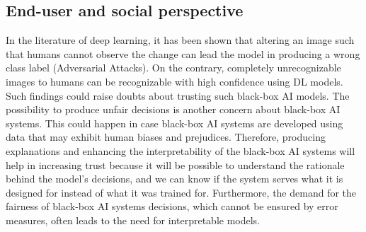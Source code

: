 \subsection*{End-user and social perspective}
In the literature of deep learning, it has been shown that altering an image such that humans cannot observe the change can lead the model in producing a wrong class label (Adversarial Attacks). 
On the contrary, completely unrecognizable images to humans can be recognizable with high confidence using DL models.
Such findings could raise doubts about trusting such black-box AI models. 
The possibility to produce unfair decisions is another concern about black-box AI systems. 
This could happen in case black-box AI systems are developed using data that may exhibit human biases and prejudices.
Therefore, producing explanations and enhancing the interpretability of the black-box AI systems will help in increasing trust because it will be possible to understand the rationale behind the model's decisions, and we can know if
the system serves what it is designed for instead of what it was trained for. Furthermore, the demand for the fairness of black-box AI systems decisions, which cannot be ensured by error measures, often leads to the need for
interpretable models.

